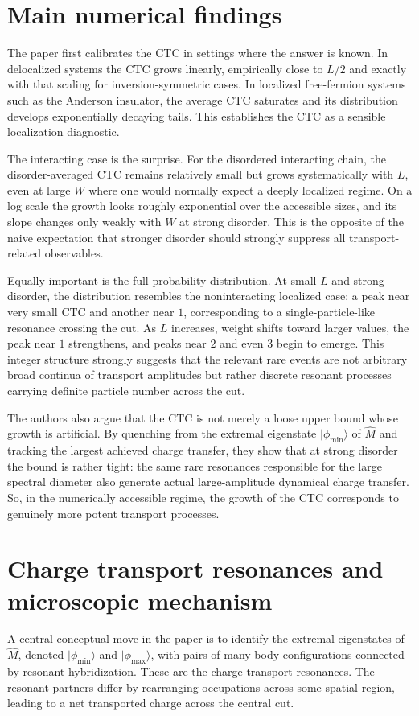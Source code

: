 \documentclass[11pt]{article}
\begin{document}
\section*{Main numerical findings}
The paper first calibrates the CTC in settings where the answer is known. In delocalized systems the CTC grows linearly, empirically close to $L/2$ and exactly with that scaling for inversion-symmetric cases. In localized free-fermion systems such as the Anderson insulator, the average CTC saturates and its distribution develops exponentially decaying tails. This establishes the CTC as a sensible localization diagnostic.

The interacting case is the surprise. For the disordered interacting chain, the disorder-averaged CTC remains relatively small but grows systematically with $L$, even at large $W$ where one would normally expect a deeply localized regime. On a log scale the growth looks roughly exponential over the accessible sizes, and its slope changes only weakly with $W$ at strong disorder. This is the opposite of the naive expectation that stronger disorder should strongly suppress all transport-related observables.

Equally important is the full probability distribution. At small $L$ and strong disorder, the distribution resembles the noninteracting localized case: a peak near very small CTC and another near $1$, corresponding to a single-particle-like resonance crossing the cut. As $L$ increases, weight shifts toward larger values, the peak near $1$ strengthens, and peaks near $2$ and even $3$ begin to emerge. This integer structure strongly suggests that the relevant rare events are not arbitrary broad continua of transport amplitudes but rather discrete resonant processes carrying definite particle number across the cut.

The authors also argue that the CTC is not merely a loose upper bound whose growth is artificial. By quenching from the extremal eigenstate $|\phi_{\min}\rangle$ of $\hat M$ and tracking the largest achieved charge transfer, they show that at strong disorder the bound is rather tight: the same rare resonances responsible for the large spectral diameter also generate actual large-amplitude dynamical charge transfer. So, in the numerically accessible regime, the growth of the CTC corresponds to genuinely more potent transport processes.

\section*{Charge transport resonances and microscopic mechanism}
A central conceptual move in the paper is to identify the extremal eigenstates of $\hat M$, denoted $|\phi_{\min}\rangle$ and $|\phi_{\max}\rangle$, with pairs of many-body configurations connected by resonant hybridization. These are the charge transport resonances. The resonant partners differ by rearranging occupations across some spatial region, leading to a net transported charge across the central cut.
\end{document}
